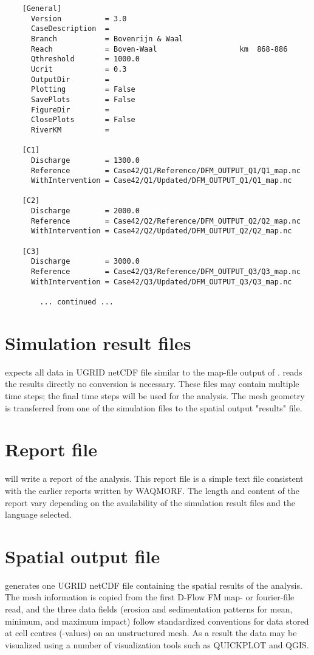\begin{Verbatim}
    [General]
      Version          = 3.0
      CaseDescription  = 
      Branch           = Bovenrijn & Waal
      Reach            = Boven-Waal                   km  868-886
      Qthreshold       = 1000.0
      Ucrit            = 0.3
      OutputDir        = 
      Plotting         = False
      SavePlots        = False
      FigureDir        = 
      ClosePlots       = False
      RiverKM          = 
    
    [C1]
      Discharge        = 1300.0
      Reference        = Case42/Q1/Reference/DFM_OUTPUT_Q1/Q1_map.nc
      WithIntervention = Case42/Q1/Updated/DFM_OUTPUT_Q1/Q1_map.nc
    
    [C2]
      Discharge        = 2000.0
      Reference        = Case42/Q2/Reference/DFM_OUTPUT_Q2/Q2_map.nc
      WithIntervention = Case42/Q2/Updated/DFM_OUTPUT_Q2/Q2_map.nc
    
    [C3]
      Discharge        = 3000.0
      Reference        = Case42/Q3/Reference/DFM_OUTPUT_Q3/Q3_map.nc
      WithIntervention = Case42/Q3/Updated/DFM_OUTPUT_Q3/Q3_map.nc

        ... continued ...
\end{Verbatim}

\section{Simulation result files}

\dfastmi expects all data in UGRID netCDF file similar to the map-file output of \dflowfm.
\dfastmi reads the results directly no conversion is necessary.
These files may contain multiple time steps; the final time steps will be used for the analysis.
The mesh geometry is transferred from one of the simulation files to the \dfastmi spatial output "results" file.

\section{Report file}

\dfastmi will write a report of the analysis.
This report file is a simple text file consistent with the earlier reports written by WAQMORF.
The length and content of the report vary depending on the availability of the simulation result files and the language selected.


\section{Spatial output file}

\dfastmi generates one UGRID netCDF file containing the spatial results of the analysis.
The mesh information is copied from the first D-Flow FM map- or fourier-file read, and the three data fields (erosion and sedimentation patterns for mean, minimum, and maximum impact) follow standardized conventions for data stored at cell centres (-values) on an unstructured mesh.
As a result the data may be visualized using a number of visualization tools such as QUICKPLOT and QGIS.
